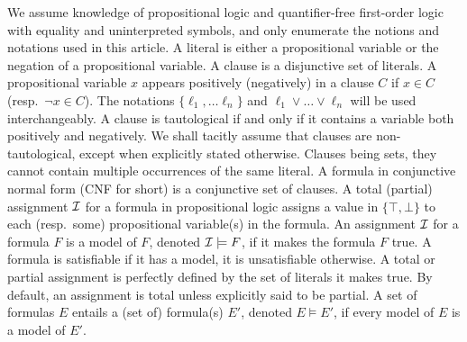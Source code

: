 \documentclass[smallextended]{svjour3}
\begin{document}
We assume knowledge of propositional logic and quantifier-free first-order logic
with equality and uninterpreted symbols, and only enumerate the notions and
notations used in this article.
A literal is either a propositional variable or the negation of a propositional
variable.  A clause is a disjunctive set of literals.  A propositional variable
$x$ appears positively (negatively) in a clause $C$ if $x \in C$ (resp.\ $\neg x
\in C$).  The notations $\{\ell_1, \dots \ell_n\}$ and $\ell_1 \vee \dots \vee
\ell_n$ will be used interchangeably.  A clause is tautological if and only if it contains a
variable both positively and negatively.  We
shall tacitly assume that clauses are non-tautological, except when explicitly stated otherwise.
Clauses being sets, they cannot contain multiple occurrences of the same
literal.  A formula in conjunctive normal form (CNF for short) is a conjunctive
set of clauses.  A total (partial) assignment $\cal I$ for a formula in
propositional logic assigns a value in $\{\top, \bot\}$ to each (resp.\ some)
propositional variable(s) in the formula.  An assignment $\cal I$ for a formula
$F$ is a model of $F$, denoted ${\cal I}\models F$, if it makes the formula $F$
true.  A formula is satisfiable if it has a model, it is unsatisfiable
otherwise.  A total or partial assignment is perfectly defined by the set of
literals it makes true.  By default, an assignment is total unless explicitly
said to be partial.  A set of formulas $E$ entails a (set of) formula(s) $E'$,
denoted $E\models E'$, if every model of $E$ is a model of $E'$.


\end{document}
